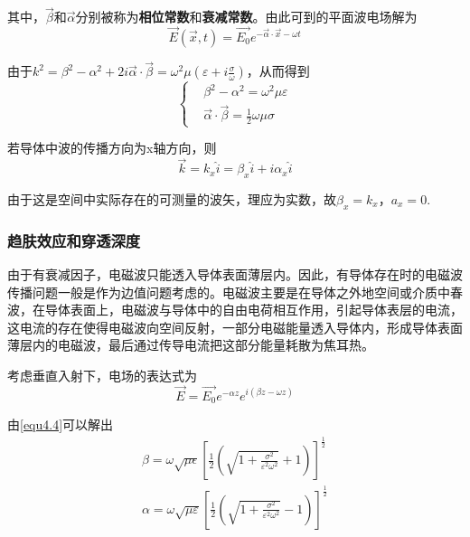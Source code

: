\documentclass[UTF8]{ctexart}
\begin{document}
\noindent 其中，$\vec{\beta}$和$\vec{\alpha}$分别被称为\textbf{相位常数}和\textbf{衰减常数}。由此可到的平面波电场解为
\begin{equation}
    \vec{E}(\vec{x},t) = \vec{E_0}e^{-\vec{\alpha} \cdot \vec{x}-\omega t}
\end{equation}

    由于$k^2 = \beta^2 - \alpha^2 + 2 i \vec{\alpha} \cdot \vec{\beta} = \omega^2 \mu (\varepsilon + i \frac{\sigma}{\omega})$，从而得到
    \begin{equation}
        \left \{ \begin{aligned}
            &\beta^2 - \alpha^2 = \omega^2 \mu \varepsilon \\
            & \vec{\alpha} \cdot \vec{\beta} = \frac{1}{2} \omega \mu \sigma 
        \end{aligned} \right.\label{equ4.4}
    \end{equation}

    若导体中波的传播方向为x轴方向，则
    \begin{equation}
        \vec{k} = k_x \hat{i} = \beta_x \hat{i} + i \alpha_x \hat{i}
    \end{equation}

\noindent 由于这是空间中实际存在的可测量的波矢，理应为实数，故$\beta_x = k_x$，$a_x=0$.

    \subsubsection{趋肤效应和穿透深度}
    由于有衰减因子，电磁波只能透入导体表面薄层内。因此，有导体存在时的电磁波传播问题一般是作为边值问题考虑的。电磁波主要是在导体之外地空间或介质中春波，在导体表面上，电磁波与导体中的自由电荷相互作用，引起导体表层的电流，这电流的存在使得电磁波向空间反射，一部分电磁能量透入导体内，形成导体表面薄层内的电磁波，最后通过传导电流把这部分能量耗散为焦耳热。
    
    考虑垂直入射下，电场的表达式为
    \begin{equation}
        \vec{E} = \vec{E_0} e^{-\alpha z} e^{i(\beta z - \omega z)}
    \end{equation}

    由\autoref{equ4.4}可以解出
    \begin{equation}
    \begin{array}{l}{\beta=\omega \sqrt{\mu \epsilon}\left[\frac{1}{2}(\sqrt{1+\frac{\sigma^{2}}{\varepsilon^{2} \omega^{2}}}+1)\right]^{\frac{1}{2}}} \\ {\alpha=\omega \sqrt{\mu \varepsilon}\left[\frac{1}{2}(\sqrt{1+\frac{\sigma^{2}}{\varepsilon^{2} \omega^{2}}}-1)\right]^{\frac{1}{2}}}\end{array}
    \end{equation}
\end{document}
